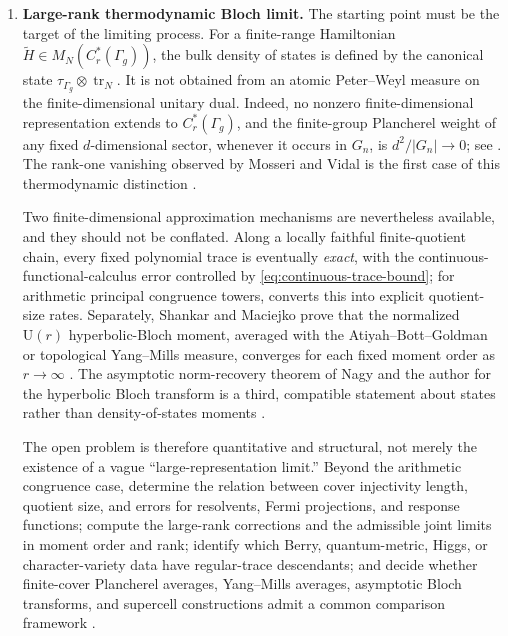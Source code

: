 \documentclass[11pt]{article}
\theoremstyle{definition}
\theoremstyle{remark}
\newcommand{\UU}{\mathrm U}
\newcommand{\tr}{\operatorname{tr}}
\begin{document}
\begin{enumerate}[label=\arabic*.,leftmargin=2.0em]
\item \textbf{Large-rank thermodynamic Bloch limit.}
  The starting point must be the target of the limiting process.  For a
  finite-range Hamiltonian
  \(\widetilde H\in M_N(C_r^*(\Gamma_g))\), the bulk density of states is
  defined by the canonical state
  \(\tau_{\Gamma_g}\otimes\tr_N\).  It is not obtained from an atomic
  Peter--Weyl measure on the finite-dimensional unitary dual.  Indeed, no
  nonzero finite-dimensional representation extends to
  \(C_r^*(\Gamma_g)\), and the finite-group Plancherel weight of any fixed
  \(d\)-dimensional sector, whenever it occurs in \(G_n\), is
  \(d^2/|G_n|\to0\); see
  .  The rank-one vanishing observed
  by Mosseri and Vidal is the first case of this thermodynamic distinction
  \cite{MosseriVidal2023,LuxProdanCayley2024}.

  Two finite-dimensional approximation mechanisms are nevertheless
  available, and they should not be conflated.  Along a locally faithful
  finite-quotient chain, every fixed polynomial trace is eventually
  \emph{exact}, with the continuous-functional-calculus error controlled by
  \eqref{eq:continuous-trace-bound}; for arithmetic principal congruence
  towers,  converts this into explicit
  quotient-size rates.  Separately, Shankar and Maciejko prove that the
  normalized \(\UU(r)\) hyperbolic-Bloch moment, averaged with the
  Atiyah--Bott--Goldman or topological Yang--Mills measure, converges for
  each fixed moment order as \(r\to\infty\)
  \cite{ShankarMaciejko2024}.  The asymptotic norm-recovery theorem of Nagy
  and the author for the hyperbolic Bloch transform is a third, compatible
  statement about states rather than density-of-states moments
  \cite{NagyRayan2024}.

  The open problem is therefore quantitative and structural, not merely the
  existence of a vague ``large-representation limit.''  Beyond the arithmetic
  congruence case, determine the relation between cover injectivity length,
  quotient size, and errors for resolvents, Fermi projections, and response
  functions; compute the
  large-rank corrections and the admissible joint limits in moment order
  and rank; identify which Berry, quantum-metric, Higgs, or
  character-variety data have regular-trace descendants; and decide whether
  finite-cover Plancherel averages, Yang--Mills averages, asymptotic Bloch
  transforms, and supercell constructions admit a common comparison framework
  \cite{LuxProdan2023,LenggenhagerEtAl2023}.


\end{enumerate}
\end{document}
